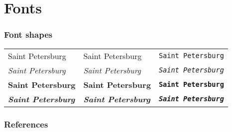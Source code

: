 \documentclass[aspectratio=169]{beamer}
\begin{document}
\section{Fonts}

\begin{frame}[fragile]
	\frametitle{Font shapes}
	\begin{center}
		\begin{tabular}{lll}
			\textup{\textsf{Saint Petersburg}} &
			\textup{\textrm{Saint Petersburg}} &
			\textup{\texttt{Saint Petersburg}} \\
			\textit{\textsf{Saint Petersburg}} &
			\textit{\textrm{Saint Petersburg}} &
			\textit{\texttt{Saint Petersburg}} \\
			\textbf{\textsf{Saint Petersburg}} &
			\textbf{\textrm{Saint Petersburg}} &
			\textbf{\texttt{Saint Petersburg}} \\
			\textit{\textbf{\textsf{Saint Petersburg}}} &
			\textit{\textbf{\textrm{Saint Petersburg}}} &
			\textit{\textbf{\texttt{Saint Petersburg}}} \\
		\end{tabular}
	\end{center}
\end{frame}

\begin{frame}%
	\frametitle{References}
	\nocite*{}
	
	
\end{frame}
\end{document}
